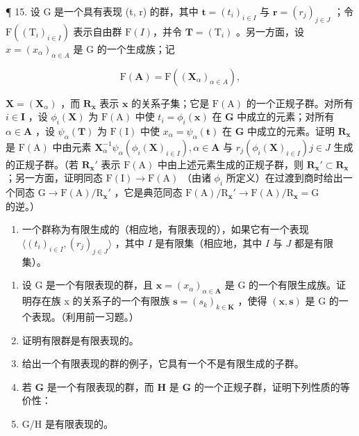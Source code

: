 ¶ 15. 设 G 是一个具有表现 (t, r) 的群，其中 \(\mathbf{t} = (t_{i})_{i \in I}\) 与 \(\mathbf{r} = (r_{j})_{j \in J}\) ；令 \(\mathrm{F}((\mathrm{T}_{i})_{i \in I})\) 表示自由群 \(\mathrm{F}(I)\)，并令 \(\mathbf{T} = (\mathrm{T}_{i})\) 。另一方面，设 \(x = (x_{\alpha})_{\alpha \in A}\) 是 G 的一个生成族；记

\[
\mathrm{F} (\mathbf {A}) = \mathrm{F} ((\mathbf {X} _ {\alpha}) _ {\alpha \in A}),
\]

\(\mathbf{X} = (\mathbf{X}_{\alpha})\) ，而 \(\mathbf{R}_{\mathbf{x}}\) 表示 \(\mathbf{x}\) 的关系子集；它是 \(\mathrm{F(A)}\) 的一个正规子群。对所有 \(i \in \mathbf{I}\) ，设 \(\phi_i(\mathbf{X})\) 为 \(\mathrm{F(A)}\) 中使 \(t_i = \phi_i(\mathbf{x})\) 在 \(\mathbf{G}\) 中成立的元素；对所有 \(\alpha \in \mathbf{A}\) ，设 \(\psi_{\alpha}(\mathbf{T})\) 为 \(\mathrm{F(I)}\) 中使 \(x_{\alpha} = \psi_{\alpha}(\mathbf{t})\) 在 \(\mathbf{G}\) 中成立的元素。证明 \(\mathbf{R}_{\mathbf{x}}\) 是 \(\mathrm{F(A)}\) 中由元素 \(\mathbf{X}_{\alpha}^{-1} \psi_{\alpha}(\phi_i(\mathbf{X})_{i \in I}), \alpha \in \mathbf{A}\) 与 \(r_j(\phi_i(\mathbf{X})_{i \in I}) j \in J\) 生成的正规子群。（若 \(\mathbf{R}_{\mathbf{x}}'\) 表示 \(\mathrm{F(A)}\) 中由上述元素生成的正规子群，则 \(\mathbf{R}_{\mathbf{x}}' \subset \mathbf{R}_{\mathbf{x}}\) ；另一方面，证明同态 \(\mathrm{F(I)} \to \mathrm{F(A)}\) （由诸 \(\phi_i\) 所定义）在过渡到商时给出一个同态 \(\mathrm{G} \to \mathrm{F(A)} / \mathrm{R}_{\mathbf{x}}'\) ，它是典范同态 \(\mathrm{F(A)} / \mathrm{R}_{\mathbf{x}}' \to \mathrm{F(A)} / \mathrm{R}_{\mathbf{x}} = \mathrm{G}\) 的逆。）

\begin{enumerate}
\def\labelenumi{\arabic{enumi}.}
\setcounter{enumi}{15}
\tightlist
\item
  一个群称为有限生成的（相应地，有限表现的），如果它有一个表现 \(\langle (t_i)_{i\in I}, (r_j)_{j\in J}\rangle\) ，其中 \(I\) 是有限集（相应地，其中 \(I\) 与 \(J\) 都是有限集）。
\end{enumerate}

\begin{enumerate}
\def\labelenumi{(\alph{enumi})}
\item
  设 G 是一个有限表现的群，且 \(\mathbf{x} = (x_{\alpha})_{\alpha \in \mathbf{A}}\) 是 G 的一个有限生成族。证明存在族 x 的关系子的一个有限族 \(\mathbf{s} = (s_{k})_{k \in \mathbf{K}}\) ，使得 \((\mathbf{x}, \mathbf{s})\) 是 G 的一个表现。（利用前一习题。）
\item
  证明有限群是有限表现的。
\item
  给出一个有限表现的群的例子，它具有一个不是有限生成的子群。
\item
  若 \(\mathbf{G}\) 是一个有限表现的群，而 \(\mathbf{H}\) 是 \(\mathbf{G}\) 的一个正规子群，证明下列性质的等价性：
\item
  G/H 是有限表现的。
\end{enumerate}

